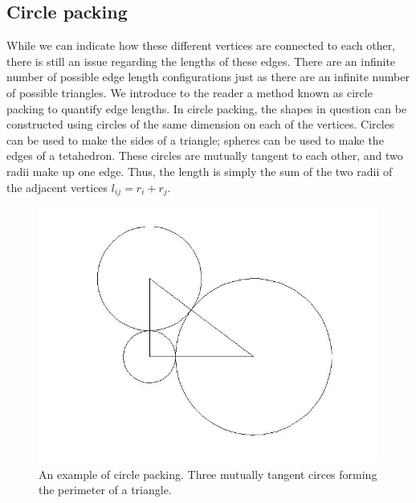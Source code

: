 \documentclass[12pt]{article}
\begin{document}
\subsection{Circle packing}
\maketitle

\noindent While we can indicate how these different vertices are connected to each other, there is still an issue regarding the lengths of these edges. There are an infinite number of possible edge length configurations just as there are an infinite number of possible triangles. We introduce to the reader a method known as circle packing to quantify edge lengths. In circle packing, the shapes in question can be constructed using circles of the same dimension on each of the vertices. Circles can be used to make the sides of a triangle; spheres can be used to make the edges of a tetahedron. These circles are mutually tangent to each other, and two radii make up one edge. Thus, the length is simply the sum of the two radii of the adjacent vertices $l_{ij} = r_i + r_j$.
  
\begin{figure}
\begin{center}
\includegraphics[scale = 0.3]{righttriangulation.jpg}
\end{center}
\caption{An example of circle packing. Three mutually tangent circes forming the perimeter of a triangle.}
\end{figure}
\end{document}
